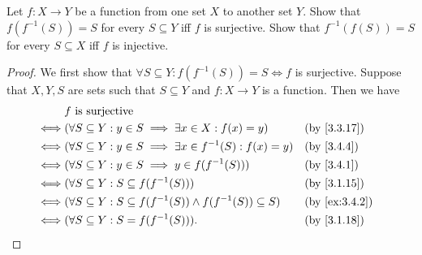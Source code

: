 \begin{ex}\label{ex:3.4.5}
  Let \(f : X \to Y\) be a function from one set \(X\) to another set \(Y\).
  Show that \(f(f^{-1}(S)) = S\) for every \(S \subseteq Y\) iff \(f\) is surjective.
  Show that \(f^{-1}(f(S)) = S\) for every \(S \subseteq X\) iff \(f\) is injective.
\end{ex}

\begin{proof}
  We first show that \(\forall S \subseteq Y : f(f^{-1}(S)) = S \iff f\) is surjective.
  Suppose that \(X, Y, S\) are sets such that \(S \subseteq Y\) and \(f : X \to Y\) is a function.
  Then we have
  \begin{align*}
         & f \text{ is surjective}                                                                              \\
    \iff & (\forall S \subseteq Y : y \in S \implies \exists x \in X : f(x) = y)             &  & \by{3.3.17}   \\
    \iff & (\forall S \subseteq Y : y \in S \implies \exists x \in f^{-1}(S) : f(x) = y)     &  & \by{3.4.4}    \\
    \iff & (\forall S \subseteq Y : y \in S \implies y \in f(f^{-1}(S)))                     &  & \by{3.4.1}    \\
    \iff & (\forall S \subseteq Y : S \subseteq f(f^{-1}(S)))                                &  & \by{3.1.15}   \\
    \iff & (\forall S \subseteq Y : S \subseteq f(f^{-1}(S)) \land f(f^{-1}(S)) \subseteq S) &  & \by{ex:3.4.2} \\
    \iff & (\forall S \subseteq Y : S = f(f^{-1}(S))).                                       &  & \by{3.1.18}
  \end{align*}


\end{proof}
